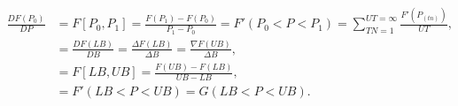 \begin{align} \frac{DF(P_0)}{DP} & = F[P_0,P_1]=\frac{F(P_1)-F(P_0)}{P_1-P_0}=F'(P_0 < P < P_1)=\sum_{TN=1}^{UT=\infty}\frac{F'(P_{(tn)})}{UT}, \\[8pt] & = \frac{DF(LB)}{DB}=\frac{\Delta F(LB)}{\Delta B}=\frac{\nabla F(UB)}{\Delta B}, \\[8pt] & = F[LB,UB]=\frac{F(UB)-F(LB)}{UB-LB}, \\[8pt] & =F'(LB < P < UB)=G(LB < P < UB). \end{align}
